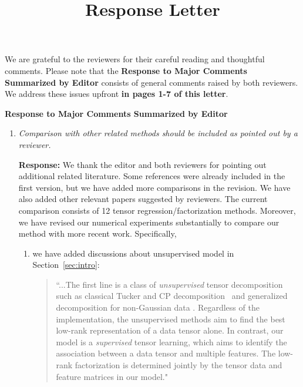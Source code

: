 \documentclass[11pt]{article}
\title{\textbf{Response Letter}}
\date{}
\author{}
\theoremstyle{plain}
\theoremstyle{definition}
\begin{document}
\maketitle
\vspace{-1.5cm}

We are grateful to the reviewers for their careful reading and thoughtful comments. Please note that the \textbf{Response to Major Comments Summarized by Editor} consists of general comments raised by both reviewers. We address these issues upfront {\bf in pages 1-7 of this letter}. 

\begin{center}
    \textbf{Response to Major Comments Summarized by Editor}
\end{center}

\begin{enumerate}[wide, labelwidth=!, labelindent=0pt]
    \item \textit{Comparison with other related methods should be included as pointed out by a reviewer.}
    
    \textbf{Response:} We thank the editor and both reviewers for pointing out additional related literature. Some references \citep{chi2012tensors, hong2020generalized, raskutti2019convex} were already included in the first version, but we have added more comparisons in the revision. We have also added other relevant papers suggested by reviewers. The current comparison consists of 12 tensor regression/factorization methods. Moreover, we have revised our numerical experiments substantially to compare our method with more recent work. Specifically, 
    \begin{enumerate}[wide, labelwidth=!, labelindent=0pt]
        \item we have added discussions about unsupervised model in Section~\ref{sec:intro}: 
        \begin{quote}
            ``...The first line is a class of \textit{unsupervised} tensor decomposition such as classical Tucker and CP decomposition~\citep{de2000multilinear, kolda2009tensor, wang2017tensor} and generalized decomposition for non-Gaussian data \citep{chi2012tensors, tarzanagh2019regularized,hong2020generalized,  li2020generalized}. Regardless of the implementation, the unsupervised methods aim to find the best low-rank representation of a data tensor alone. In contrast, our model is a \textit{supervised} tensor learning, which aims to identify the association between a data tensor and multiple features. The low-rank factorization is determined jointly by the tensor data and feature matrices in our model."
        \end{quote}
        

\end{enumerate}
\end{enumerate}
\end{document}
